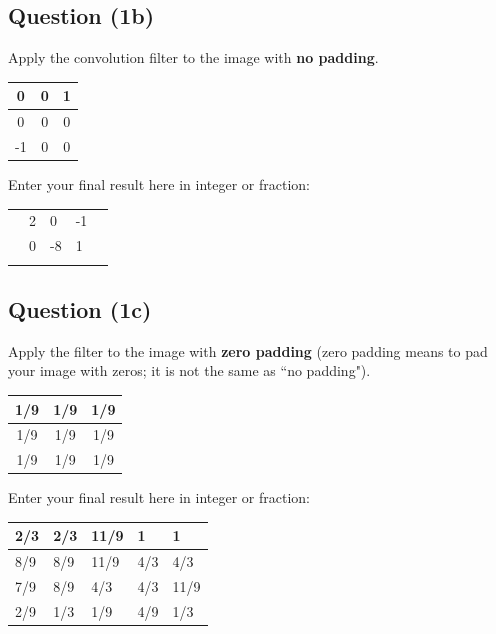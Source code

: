 \documentclass[12pt]{article}
\begin{document}
\subsection*{Question (1b)} Apply the convolution filter to the image with \textbf{no padding}.
\begin{center}
\begin{tabular}{|c|c|c|}
\hline
0  & 0 & 1 \\ \hline
0  & 0 & 0 \\ \hline
-1 & 0 & 0 \\ \hline
\end{tabular}
\end{center}

\noindent Enter your final result here in integer or fraction:

\begin{center}
\begin{tabular}{|l|l|l|l|l|}
\hline
\hspace{1mm} & \hspace{1mm} & \hspace{1mm} & \hspace{1mm} & \hspace{1mm} \\ \hline
\hspace{1mm} & 2 & 0 & -1 & \hspace{1mm} \\ \hline
\hspace{1mm} & 0 & -8 & 1 & \hspace{1mm} \\ \hline
\hspace{1mm} & \hspace{1mm} & \hspace{1mm} & \hspace{1mm} & \hspace{1mm} \\ \hline
\end{tabular}
\end{center}

\newpage

\subsection*{Question (1c)} Apply the filter to the image with \textbf{zero padding} (zero padding means to pad your image with zeros; it is not the same as ``no padding").
\begin{center}
\begin{tabular}{|c|c|c|}
\hline
1/9  & 1/9 & 1/9 \\ \hline
1/9  & 1/9 & 1/9 \\ \hline
1/9  & 1/9 & 1/9 \\ \hline
\end{tabular}
\end{center}

\noindent Enter your final result here in integer or fraction:

\begin{center}
\begin{tabular}{|l|l|l|l|l|}
\hline
2/3 & 2/3 & 11/9 & 1 & 1 \\ \hline
8/9 & 8/9 & 11/9 & 4/3 & 4/3 \\ \hline
7/9 & 8/9 & 4/3 & 4/3 & 11/9 \\ \hline
2/9 & 1/3 & 1/9 & 4/9 & 1/3 \\ \hline
\end{tabular}
\end{center}
\end{document}
